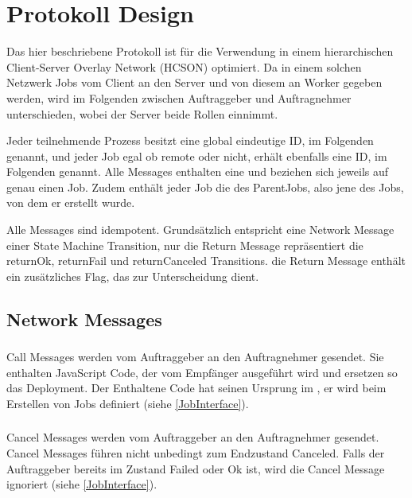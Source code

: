 
\chapter{Protokoll Design}
\label{K4}
Das hier beschriebene Protokoll ist für die Verwendung in einem hierarchischen Client-Server Overlay Network (HCSON) optimiert.
Da in einem solchen Netzwerk Jobs vom Client an den Server und von diesem an Worker gegeben werden, wird im Folgenden zwischen Auftraggeber und Auftragnehmer unterschieden, wobei der Server beide Rollen einnimmt.

Jeder teilnehmende Prozess besitzt eine global eindeutige ID, im Folgenden \NodeID{} genannt, und jeder Job egal ob remote oder nicht, erhält ebenfalls eine ID, im Folgenden \JobID{} genannt.
Alle Messages enthalten eine \JobID{} und beziehen sich jeweils auf genau einen Job.
Zudem enthält jeder Job die \JobID{} des ParentJobs, also jene des Jobs, von dem er erstellt wurde.

Alle Messages sind idempotent. Grundsätzlich entspricht eine Network Message einer State Machine Transition, nur die Return Message repräsentiert die returnOk, returnFail und returnCanceled Transitions. die Return Message enthält ein zusätzliches Flag, das zur Unterscheidung dient.




\section{Network Messages}
\label{messages}

\subsection{\CallMessage{}}
Call Messages werden vom Auftraggeber an den Auftragnehmer gesendet.
Sie enthalten JavaScript Code, der vom Empfänger ausgeführt wird und ersetzen so das Deployment.
Der Enthaltene Code hat seinen Ursprung im \ApplicationLayer{}, er wird beim Erstellen von Jobs definiert (siehe \ref{JobInterface}).

\subsection{\CancelMessage{}}
Cancel Messages werden vom Auftraggeber an den Auftragnehmer gesendet.
Cancel Messages führen nicht unbedingt zum Endzustand Canceled.
Falls der Auftraggeber bereits im Zustand Failed oder Ok ist, wird die Cancel Message ignoriert (siehe \ref{JobInterface}).

